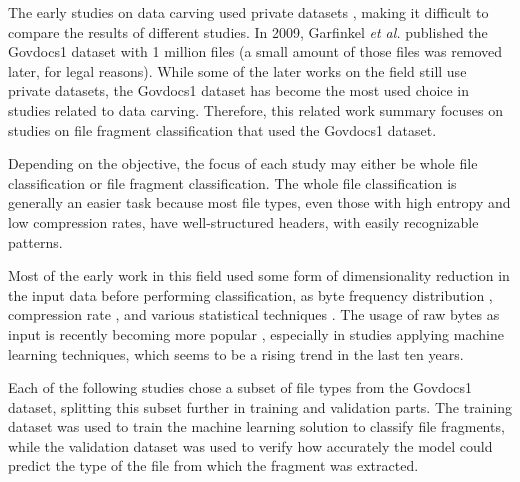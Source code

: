 The early studies on data carving used private datasets \cite{karresand_file_2006} \cite{veenman_statistical_2007} \cite{erbacher_identification_2007} \cite{moody_sadi-statistical_2008} \cite{calhoun_predicting_2008} \cite{li_novel_2010} \cite{conti_automated_2010} \cite{kattan_gp-fileprints:_2010}, making it difficult to compare the results of different studies. In 2009, Garfinkel \textit{et al.} \cite{garfinkel_bringing_2009} published the Govdocs1 dataset with 1 million files (a small amount of those files was removed later, for legal reasons). While some of the later works on the field still use private datasets, the Govdocs1 dataset has become the most used choice in studies related to data carving.
Therefore, this related work summary focuses on studies on file fragment classification that used the Govdocs1 dataset.

Depending on the objective, the focus of each study may either be whole file classification or file fragment classification. The whole file classification is generally an easier task because most file types, even those with high entropy and low compression rates, have well-structured headers, with easily recognizable patterns.

Most of the early work in this field used some form of dimensionality reduction in the input data before performing classification, as byte frequency distribution \cite{karresand_oscarfile_2006} \cite{harris_using_2007} \cite{amirani_new_2008} \cite{ahmed_content-based_2010} \cite{ahmed_fast_2010} \cite{sportiello_context-based_2012} \cite{amirani_feature-based_2013} \cite{qiu_new_2014} \cite{maslim_distributed_2014} \cite{ali_classification_2018}, compression rate \cite{axelsson_normalised_2010} \cite{penrose_approaches_2013}, and various statistical techniques \cite{veenman_statistical_2007} \cite{erbacher_identification_2007} \cite{moody_sadi-statistical_2008} \cite{calhoun_predicting_2008} \cite{li_novel_2010} \cite{kattan_gp-fileprints:_2010} \cite{gopal_statistical_2011}. The usage of raw bytes as input is recently becoming more popular \cite{hiester_file_2018} \cite{chen_file_2018} \cite{wang_sparse_2018} \cite{wang_file_2018} \cite{vulinovic_neural_2019}, especially in studies applying machine learning techniques, which seems to be a rising trend in the last ten years.

Each of the following studies chose a subset of file types from the Govdocs1 dataset, splitting this subset further in training and validation parts. The training dataset was used to train the machine learning solution to classify file fragments, while the validation dataset was used to verify how accurately the model could predict the type of the file from which the fragment was extracted.

